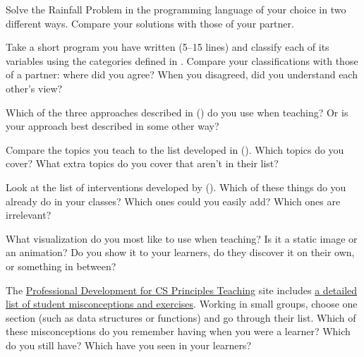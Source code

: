 
Solve the Rainfall Problem in the programming language of your choice
in two different ways. Compare your solutions with those of your
partner.


Take a short program you have written (5--15 lines) and classify each
of its variables using the categories defined in
.  Compare your classifications with those
of a partner: where did you agree? When you disagreed, did you
understand each other's view?


Which of the three approaches described in \cite{Sorv2014}
() do you use when teaching? Or is your approach
best described in some other way?


Compare the topics you teach to the list developed in \cite{Luxt2017}
().  Which topics do you cover?  What extra topics
do you cover that aren't in their list?


Look at the list of interventions developed by \cite{Viha2014}
().  Which of these things do you already do in
your classes?  Which ones could you easily add?  Which ones are
irrelevant?


What visualization do you most like to use when teaching?  Is it a
static image or an animation?  Do you show it to your learners, do
they discover it on their own, or something in between?


The \href{http://www.pd4cs.org/}{Professional Development for CS
  Principles Teaching} site includes
\href{http://www.pd4cs.org/mc-index/}{a detailed list of student
  misconceptions and exercises}.  Working in small groups, choose one
section (such as data structures or functions) and go through their
list.  Which of these misconceptions do you remember having when you
were a learner?  Which do you still have?  Which have you seen in your
learners?
